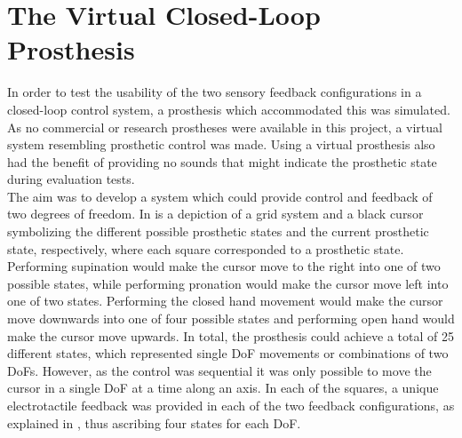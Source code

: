 
\section{The Virtual Closed-Loop Prosthesis} \label{sec:vp}

In order to test the usability of the two sensory feedback configurations in a closed-loop control system, a prosthesis which accommodated this was simulated. As no commercial or research prostheses were available in this project, a virtual system resembling prosthetic control was made. Using a virtual prosthesis also had the benefit of providing no sounds that might indicate the prosthetic state during evaluation tests. \\
The aim was to develop a system which could provide control and feedback of two degrees of freedom. In  is a depiction of a grid system and a black cursor symbolizing the different possible prosthetic states and the current prosthetic state, respectively, where each square corresponded to a prosthetic state. Performing supination would make the cursor move to the right into one of two possible states, while performing pronation would make the cursor move left into one of two states. Performing the closed hand movement would make the cursor move downwards into one of four possible states and performing open hand would make the cursor move upwards. In total, the prosthesis could achieve a total of 25 different states, which represented single DoF movements or combinations of two DoFs. However, as the control was sequential it was only possible to move the cursor in a single DoF at a time along an axis. In each of the squares, a unique electrotactile feedback was provided in each of the two feedback configurations, as explained in , thus ascribing four states for each DoF.      
     

